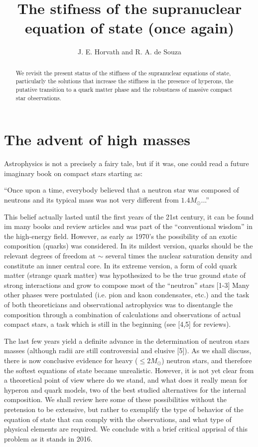 \documentclass[a4paper]{jpconf}
\begin{document}
\title{The stifness of the supranuclear equation of state (once again)}

\author{J. E. Horvath and R. A. de Souza}

\address{Departamento de Astronomia, IAG-USP, S\~ao Paulo University, 05579-090 S\~ao Paulo SP, Brazil}


\begin{abstract}
We revisit the present status of the stiffness of the supranuclear equations of state, particularly the solutions that 
increase the stiffness in the presence of hyperons, the putative transition to a quark matter phase 
and the robustness of massive compact star observations.
\end{abstract}

\section{The advent of high masses}
Astrophysics is not a precisely a fairy tale, but if it was, one could read a future imaginary book on compact stars starting as:

\bigskip
``Once upon a time, everybody believed that a neutron star was composed of neutrons and its typical mass 
was not very different from $1.4 M_{\odot}$...'' 
\bigskip

This belief actually lasted until the first years of the 21st century, it can be found im many books and review 
articles and was part of the ``conventional wisdom'' in the high-energy field. However, as early as 1970's 
the possibility of an exotic composition (quarks) was considered. In its mildest version, quarks should 
be the relevant degrees of freedom at $\sim$ several times the nuclear saturation density and constitute 
an inner central core. In its extreme version, a form of cold quark matter (strange quark matter) was hypothesized 
to be the true ground state of strong interactions and grow to compose most of the ``neutron'' stars [1-3]
Many other phases were postulated (i.e. pion and kaon condensates, etc.) and the task of both theoreticians 
and observational astrophysics was to disentangle the composition through a combination of calculations and 
observations of actual compact stars, a task which is still in the beginning (see [4,5] for reviews). 

The last few years yield a definite advance in the determination of neutron stars masses (although radii are 
still controversial and elusive [5]). As we shall discuss, there is now conclusive evidence for heavy ($\leq 2 M_{\odot}$) 
neutron stars, and therefore the softest equations of state became unrealistic. However, it is not yet clear from a 
theoretical point of view where do we stand, and what does it really mean for hyperon and quark models, two 
of the best studied alternatives for the internal composition. We shall review here some of these possibilities 
without the pretension to be extensive, but rather to exemplify the type of behavior of the equation of state 
that can comply with the observations, and what type of physical elements are required. We conclude with a 
brief critical apprisal of this problem as it stands in 2016.
\end{document}
